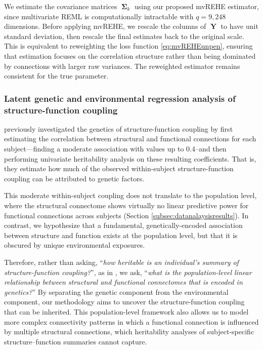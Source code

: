 \documentclass[12pt]{article}
\DeclareMathOperator{\Y}{\mathbf{Y}}
\DeclareMathOperator{\bSigma}{\mathbf{\Sigma}}
\begin{document}
We estimate the covariance matrices $\bSigma_k$ using our proposed mvREHE estimator, since multivariate REML is computationally intractable with $q = 9,248$ dimensions. Before applying mvREHE, we rescale the columns of $\Y$ to have unit standard deviation, then rescale the final estimates back to the original scale. This is equivalent to reweighting the loss function \eqref{eq:mvREHEunpen}, ensuring that estimation focuses on the correlation structure rather than being dominated by connections with larger raw variances. The reweighted estimator remains consistent for the true parameter.


\vspace{-3.5mm}

\subsubsection{Latent genetic and environmental regression analysis of structure-function coupling}

\textcite{gu2021heritability} previously investigated the genetics of structure-function coupling by first estimating the correlation between structural and functional connections for each subject---finding a moderate association with values up to 0.4--and then performing univariate heritability analysis on these resulting coefficients. That is, they estimate how much of the observed within-subject structure-function coupling can be attributed to genetic factors.

This moderate within-subject coupling does not translate to the population level, where the structural connectome shows virtually no linear predictive power for functional connections across subjects (Section \ref{subsec:datanalaysisresults}). In contrast, we hypothesize that a fundamental, genetically-encoded association between structure and function exists at the population level, but that it is obscured by unique environmental exposures.

Therefore, rather than asking, ``\textit{how heritable is an individual's summary of structure-function coupling?}'', as in \textcite{gu2021heritability}, we ask, ``\textit{what is the population-level linear relationship between structural and functional connectomes that is encoded in genetics?}'' By separating the genetic component from the environmental component, our methodology aims to uncover the structure-function coupling that can be inherited. This population-level framework also allows us to model more complex connectivity patterns in which a functional connection is influenced by multiple structural connections, which heritability analyses of subject-specific structure–function summaries cannot capture.
\end{document}
